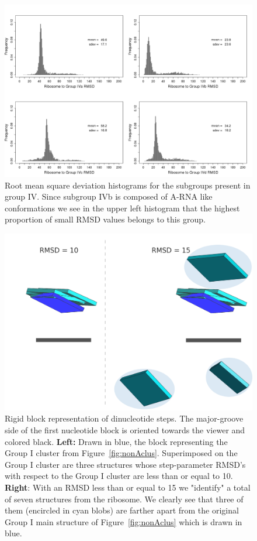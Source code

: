 \begin{figure}[htbp]
 \centering
\includegraphics[angle=90, scale=0.5]{Chapter2/RMSDschneider2.png}
\caption{Root  mean  square  deviation  histograms for  the  subgroups
  present in group  IV.  Since subgroup IVb is  composed of A-RNA like
  conformations we  see in the  upper left histogram that  the highest
  proportion of small RMSD values belongs to this group.}
 \label{fig:histo2}
\end{figure}

\begin{figure}[htp]
 \centering
\includegraphics[angle=0, scale=1.5]{Chapter2/G1at10_15b.png}
\caption{Rigid  block   representation  of  dinucleotide   steps.  The
  major-groove side of the  first nucleotide block is oriented towards
  the  viewer and  colored black.  \textbf{Left:} Drawn  in  blue, the
  block     representing     the      Group     I     cluster     from
  Figure~\ref{fig:nonAclus}. Superimposed  on the Group  I cluster are
  three  structures whose  step-parameter RMSD's  with respect  to the
  Group I cluster  are less than or equal  to 10. \textbf{Right}: With
  an RMSD  less than  or equal to  15 we  "identify" a total  of seven
  structures  from the  ribosome. We  clearly see  that three  of them
  (encircled in cyan blobs) are  farther apart from the original Group
  I  main structure  of  Figure~\ref{fig:nonAclus} which  is drawn  in
  blue.}
 \label{fig:superimpose}
\end{figure}

